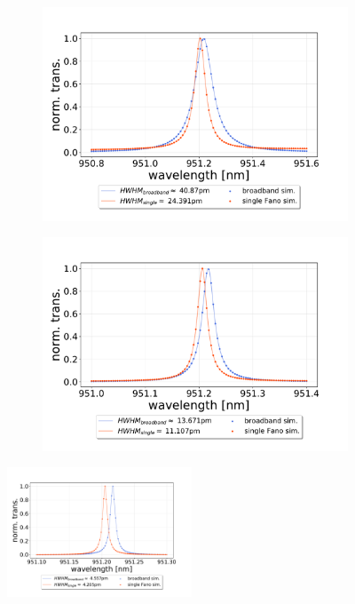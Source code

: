 \begin{figure}[h!]
\begin{subfigure}[b]{0.49\textwidth}
        \includegraphics[width=\textwidth]{figures/sim_single_vs_broadband_90um.pdf}
        \caption{}
        \label{fig:single_vs_broadband_simulation_90um}
    \end{subfigure}
    \begin{subfigure}[b]{0.49\textwidth}
        \includegraphics[width=\textwidth]{figures/sim_single_vs_broadband_270um.pdf}
        \caption{}
        \label{fig:single_vs_broadband_simulation_270um}
    \end{subfigure}
\end{figure}
\begin{figure} \ContinuedFloat
    \centering
    \includegraphics[width=0.49\textwidth]{figures/sim_single_vs_broadband_810um.pdf}
    \caption{}
    \label{fig:single_vs_broadband_simulation_810um}
\end{figure}

